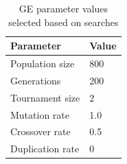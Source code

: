 \begin{table}
    \centering
    \begin{tabular}{| l | l |}
    \hline
    \textbf{Parameter} & \textbf{Value} \\ \hline
    Population size & 800 \\
    \hline
    Generations & 200 \\
    \hline
    Tournament size & 2 \\
    \hline
    Mutation rate & 1.0 \\
    \hline
    Crossover rate & 0.5 \\
    \hline
    Duplication rate & 0 \\
    \hline
    \end{tabular}
    \caption{GE parameter values selected based on searches}
    \label{tab:ge-parameters}
\end{table}

